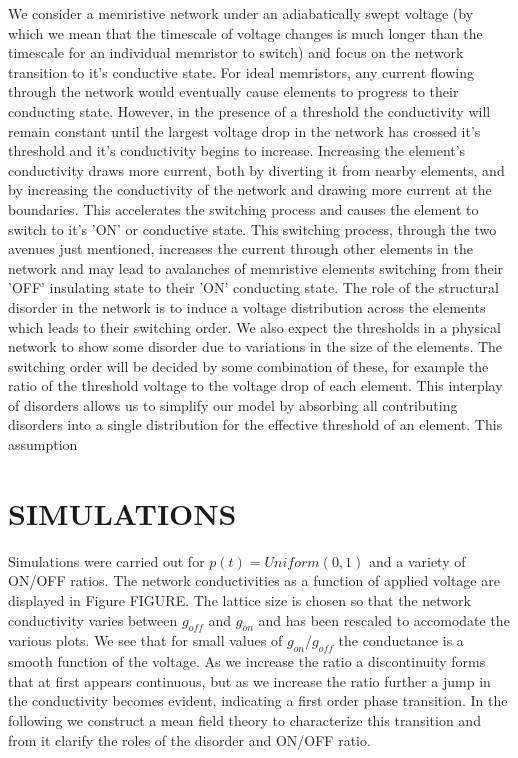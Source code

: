 \documentclass[aps,prl,preprint,groupedaddress]{revtex4-1}
\begin{document}
We consider a memristive network under an adiabatically swept voltage (by
which we
mean that the timescale of voltage changes is much longer than the timescale
for an individual memristor to switch) and focus on the network transition
to it's conductive state.  For ideal memristors, any current
flowing through the network would eventually cause elements to progress to
their conducting state.  However, in the presence of a threshold the
conductivity will remain constant until the largest voltage drop in the
network has crossed it's threshold and it's conductivity begins to increase.
Increasing the
element's conductivity draws more current, both by diverting it from nearby
elements, and by increasing the conductivity of the network and drawing more
current at the boundaries.  This accelerates the switching process and causes
the element to switch to it's 'ON' or conductive state.  This switching
process,
through the two avenues just mentioned, increases the current through other
elements in the network and may lead to avalanches of memristive elements
switching from their 'OFF' insulating state to their 'ON' conducting state. 
The role of the structural disorder in the network is to induce a voltage
distribution across the elements which leads to their switching order. We also
expect the thresholds in a physical network to show some disorder due to
variations in the size of the elements. The switching order will be decided by some
combination of these, for example the ratio of the threshold voltage to the
voltage drop of each element.  This interplay of disorders allows us to
simplify our model by absorbing all contributing disorders into a single
distribution for the effective threshold of an element.  This assumption 


\section{SIMULATIONS}

Simulations were carried out for $p(t) = Uniform(0, 1)$ and a variety of
ON/OFF ratios. The network conductivities as a function of applied voltage
are displayed in Figure FIGURE. The lattice size is chosen so that the
network conductivity varies between $g_{off}$ and $g_{on}$ and has been
rescaled to accomodate the various plots.  We see that for small values
of $g_{on}/g_{off}$ the conductance is a smooth function of the voltage.
As we increase the ratio a discontinuity forms that at first appears
continuous, but as we increase the ratio further a jump in the
conductivity becomes evident, indicating a first order
phase transition. In the following we construct a mean field theory to
characterize this transition and from it clarify the roles of the disorder and
ON/OFF ratio.
\end{document}

